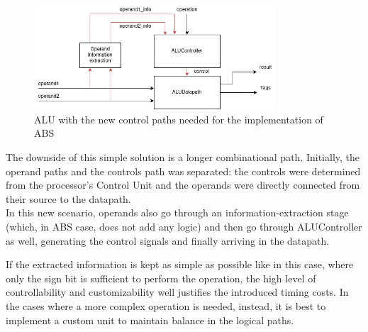 \begin{figure}[htbp]
    \center
	\includegraphics[width=0.8\textwidth]{./2-implementation/images/ALUWithABS.png}
	\caption{ALU with the new control paths needed for the implementation of ABS}
	\label{fig:alu-with-abs}
\end{figure}

The downside of this simple solution is a longer combinational path. Initially, the operand paths and the controls
path was separated: the controls were determined from the processor's Control Unit and the operands were
directly connected from their source to the datapath.\\
In this new scenario, operands also go through an information-extraction stage (which, in ABS case, does not add any
logic) and then go through ALUController as well, generating the control signals and finally arriving in the datapath.

If the extracted information is kept as simple as possible like in this case, where only the sign bit is sufficient to
perform the operation, the high level of controllability and customizability well justifies the introduced timing costs.
In the cases where a more complex operation is needed, instead, it is best to implement a custom unit to maintain
balance in the logical paths.
